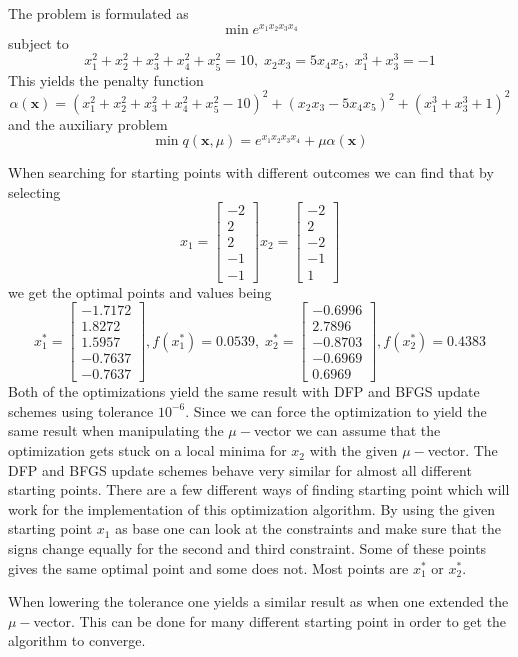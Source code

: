 
The problem is formulated as 
$$\min e^{x_1 x_2 x_3 x_4} $$ subject to $$x_1^2 + x_2^2 + x_3^2 + x_4^2 + x_5^2 = 10,\; x_2 x_3 = 5 x_4 x_5,\;x_1^3 + x_3^3 = -1$$
This yields the penalty function $$\alpha(\textbf{x}) = (x_1^2 + x_2^2 + x_3^2 + x_4^2 + x_5^2 - 10)^2+(x_2 x_3 - 5 x_4 x_5)^2 + (x_1^3 + x_3^3 +1)^2$$ and the auxiliary problem
$$\min q(\textbf{x},\mu) =  e^{x_1 x_2 x_3 x_4} + \mu\alpha(\textbf{x})$$

When searching for starting points with different outcomes we can find that by selecting 
$$x_1=\left[
\begin{array}{c}
-2\\2\\2\\-1\\-1
\end{array}
\right] x_2 =\left[
\begin{array}{c}
-2\\2\\-2\\-1\\1
\end{array}
\right] $$ we get the optimal points and values being $$x_1^*=
\left[
\begin{array}{c}
-1.7172\\1.8272\\1.5957\\-0.7637\\-0.7637
\end{array}
\right], f(x_1^*)=0.0539, \;x_2^* = \left[
\begin{array}{c}
-0.6996\\ 2.7896\\-0.8703\\-0.6969\\0.6969
\end{array}
\right],f(x_2^*)=0.4383$$
Both of the optimizations yield the same result with DFP and BFGS update schemes using tolerance $10^{-6}$. Since we can force the optimization to yield the same result when manipulating the $\mu-$vector we can assume that the optimization gets stuck on a local minima for $x_2$ with the given $\mu-$vector. The DFP and BFGS update schemes behave very similar for almost all different starting points. There are a few different ways of finding starting point which will work for the implementation of this optimization algorithm. By using the given starting point $x_1$ as base one can look at the constraints and make sure that the signs change equally for the second and third constraint. Some of these points gives the same optimal point and some does not. Most points are $x_1^*$ or $x_2^*$. 

When lowering the tolerance one yields a similar result as when one extended the $\mu-$vector. This can be done for many different starting point in order to get the  algorithm to converge.


